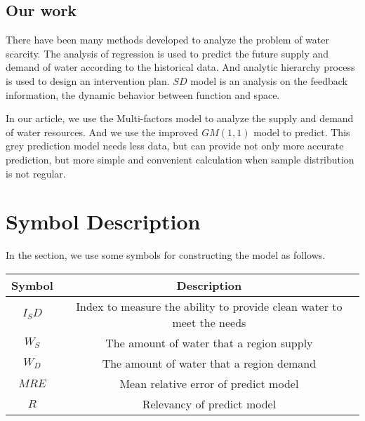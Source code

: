 \documentclass{mcmthesis}
\begin{document}
\subsection{Our work} 
\par There have been many methods developed to analyze the problem of water scarcity. The analysis of regression is used to predict the future supply and demand of water according to the historical data. And analytic hierarchy process is used to design an intervention plan. $SD$ model is an analysis on the feedback information, the dynamic behavior between function and space. 

\par In our article, we use the Multi-factors model to analyze the supply and demand of water resources.  And we use the improved $GM(1,1)$ model to predict. This grey prediction model needs less data, but can provide not only more accurate prediction, but more simple and convenient calculation when sample distribution is not regular.
\section{Symbol Description}
\par In the section, we use some symbols for constructing the model as follows.
\begin{center}
\begin{tabular}{cc}
\toprule 
Symbol & Description\\
\midrule
$I_SD$ & Index to measure the ability to provide clean water to meet the needs \\
$W_S$ & The amount of water that a region supply\\
$W_D$ & The amount of water that a region demand\\
$MRE$ & Mean relative error of predict model\\
$R$ & Relevancy of predict model\\
\bottomrule
\end{tabular}
\end{center}




\end{document}
